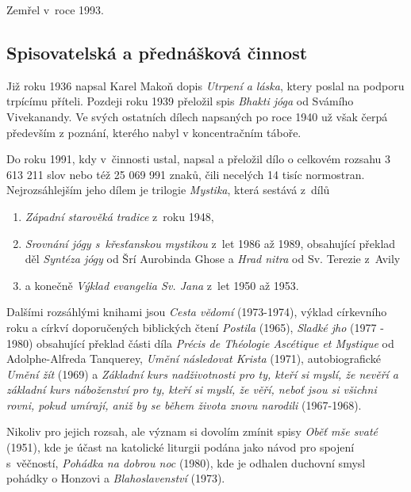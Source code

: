 Zemřel v~roce 1993.

\subsection{Spisovatelská a přednášková činnost}

Již roku 1936 napsal Karel Makoň dopis {\em Utrpení a láska}, ktery poslal na
podporu trpícímu příteli. Pozdeji roku 1939 přeložil spis {\em Bhakti
jóga}\cite{vivekananda2003bhakti} od Svámího  Vivekanandy. Ve svých ostatních
dílech napsaných po roce 1940 už však čerpá především z poznání, kterého
nabyl v koncentračním táboře.

Do roku 1991, kdy v~činnosti ustal, napsal a přeložil dílo o celkovém rozsahu
3 613 211 slov nebo též 25 069 991 znaků, čili necelých 14 tisíc normostran.
Nejrozsáhlejším jeho dílem je trilogie {\em Mystika}, která sestává z~dílů
\begin{enumerate}
\item{{\em Západní starověká tradice} z~roku 1948,}
\item{
    {\em Srovnání jógy s~křesťanskou mystikou}
    z~let 1986 až 1989, obsahující překlad děl
    {\em Syntéza jógy}\cite{aurobindo1999synthesis} od Šrí Aurobinda Ghose
    a {\em Hrad nitra}\cite{teresa1588castillo} od Sv. Terezie z~Avily
}
\item{a konečně {\em Výklad evangelia Sv. Jana} z~let 1950 až 1953.}
\end{enumerate}

Dalšími rozsáhlými knihami jsou {\em Cesta vědomí} (1973-1974),
výklad církevního roku a církví doporučených biblických čtení
{\em Postila} (1965),
{\em Sladké jho} (1977 - 1980) obsahující překlad části díla
{\em Précis de Théologie Ascétique et Mystique}\cite{tanquerey1928precis}
od Adolphe-Alfreda Tanquerey,
{\em Umění následovat Krista} (1971),
autobiografické {\em Umění žít} (1969)
a {\em Základní kurs nadživotnosti pro ty, kteří si myslí, že nevěří a základní
kurs náboženství pro ty, kteří si myslí, že věří, neboť jsou si všichni rovni,
pokud umírají, aniž by se během života znovu narodili} (1967-1968).

Nikoliv pro jejich rozsah, ale význam si dovolím zmínit spisy
{\em Oběť mše svaté} (1951), kde je účast na katolické liturgii podána jako
návod pro spojení s~věčností,
{\em Pohádka na dobrou noc} (1980), kde je odhalen duchovní smysl pohádky o
Honzovi
a {\em Blahoslavenství} (1973).

